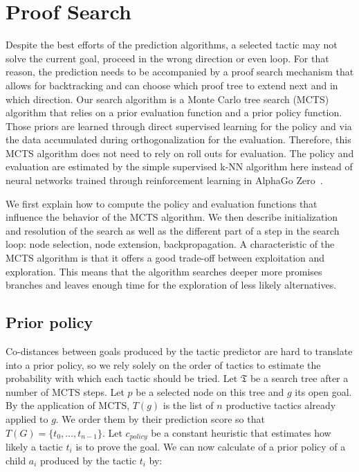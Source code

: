 \documentclass[runningheads,a4paper,draft]{svjour3}
\begin{document}
\section{Proof Search}\label{sec:proofsearch}
Despite the best efforts of the prediction algorithms, a selected tactic may
not solve the current goal, proceed in the wrong direction
or even loop. For that reason, the prediction needs to be accompanied by a
proof search mechanism that allows for backtracking and
can choose which proof tree to extend next and in which direction.
Our search algorithm is a Monte Carlo tree search (MCTS) algorithm that relies
on a prior evaluation function and a prior policy function. Those priors are
learned through direct supervised learning for the policy and via the data
accumulated during orthogonalization for the evaluation. Therefore, this MCTS
algorithm does not need to rely on roll outs for evaluation. The
policy and evaluation are estimated by the simple supervised k-NN algorithm
here instead of neural networks trained through reinforcement learning in
AlphaGo Zero~\cite{silver2017mastering}.

We first explain how to compute the policy and evaluation functions that
influence the behavior of the MCTS algorithm.
We then describe initialization and resolution of the search as well as the
different part of a step in the search loop: node selection, node
extension, backpropagation.
A characteristic of the MCTS algorithm is that it offers a good trade-off
between exploitation and exploration. This means that the algorithm searches
deeper more promises branches and leaves enough time for the exploration
of less likely alternatives.


\subsection{Prior policy}\label{sec:policy}
Co-distances between goals produced by the tactic predictor are hard
to translate into a prior policy, so we rely solely on the order of
tactics to estimate the probability with which each tactic should be tried.
Let $\mathfrak{T}$ be a search tree after a number of MCTS steps.
Let $p$ be a selected node on this tree and $g$ its open goal. By the
application of MCTS, $T(g)$ is the list of $n$ productive tactics already
applied to $g$. We order them by their prediction score so that $T(G)= \lbrace
t_0,\ldots,t_{n-1} \rbrace$.
Let $c_{policy}$ be a constant heuristic that estimates how likely a tactic
$t_i$ is to prove the goal.
We can now calculate of a prior policy of a child $a_i$ produced by the tactic
$t_i$ by:
\end{document}
